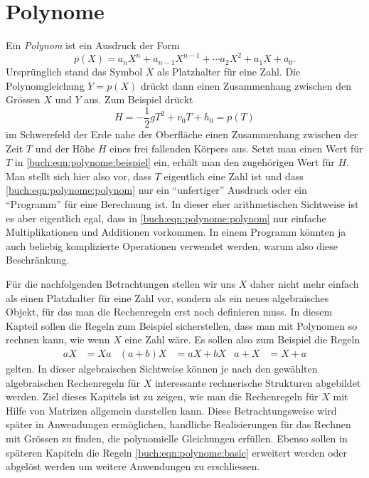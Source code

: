 %
%
%
\chapter{Polynome
\label{buch:chapter:polynome}}
Ein {\em Polynom} ist ein Ausdruck der Form
%
\begin{equation}
p(X) = a_nX^n+a_{n-1}X^{n-1} + \cdots a_2X^2 + a_1X + a_0.
\label{buch:eqn:polynome:polynom}
\end{equation}
Ursprünglich stand das Symbol $X$ als Platzhalter für eine Zahl.
Die Polynomgleichung $Y=p(X)$ drückt dann einen Zusammenhang zwischen
den Grössen $X$ und $Y$ aus.
Zum Beispiel drückt 
\begin{equation}
H = -\frac12gT^2 + v_0T +h_0 = p(T)
\label{buch:eqn:polynome:beispiel}
\end{equation}
im Schwerefeld der Erde nahe der Oberfläche einen Zusammenhang
zwischen der Zeit $T$ und der Höhe $H$ eines frei fallenden Körpers aus.
Setzt man einen Wert für $T$ in \eqref{buch:eqn:polynome:beispiel} ein,
erhält man den zugehörigen Wert für $H$.
Man stellt sich hier also vor, dass $T$ eigentlich eine Zahl ist und dass
\eqref{buch:eqn:polynome:polynom}
nur ein ``unfertiger'' Ausdruck oder ein ``Programm'' für eine Berechnung
ist.
In dieser eher arithmetischen Sichtweise ist es aber eigentlich egal, dass in
%
\eqref{buch:eqn:polynome:polynom} nur einfache Multiplikationen und
Additionen vorkommen.
In einem Programm könnten ja auch beliebig komplizierte Operationen
verwendet werden, warum also diese Beschränkung.

Für die nachfolgenden Betrachtungen stellen wir uns $X$ daher nicht
mehr einfach als einen Platzhalter für eine Zahl vor, sondern als ein neues
algebraisches Objekt, für das man die Rechenregeln erst noch definieren muss.
In diesem Kapteil sollen die Regeln zum Beispiel sicherstellen,
dass man mit Polynomen so rechnen kann, wie wenn $X$ eine Zahl wäre.
Es sollen also zum Beispiel die Regeln
\begin{align}
aX&=Xa
&
(a+b)X&=aX+bX
&
a+X &= X+a
\label{buch:eqn:polynome:basic}
\end{align}
gelten.
In dieser algebraischen Sichtweise können je nach den gewählten algebraischen
Rechenregeln für $X$ interessante rechnerische Strukturen abgebildet werden.
%
Ziel dieses Kapitels ist zu zeigen, wie man die Rechenregeln für $X$ 
mit Hilfe von Matrizen allgemein darstellen kann.
Diese Betrachtungsweise wird später in Anwendungen ermöglichen,
handliche Realisierungen für das Rechnen mit Grössen zu finden, 
die polynomielle Gleichungen erfüllen.
Ebenso sollen in späteren Kapiteln die Regeln
\eqref{buch:eqn:polynome:basic}
erweitert werden oder abgelöst werden um weitere Anwendungen zu erschliessen.

